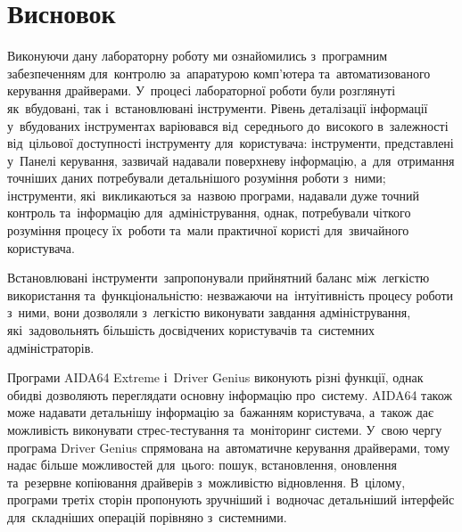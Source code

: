 \documentclass[
	a4paper,
	oneside,
	DIV = 12,
	BCOR = 10mm,
	12pt,
	headings = normal,
]{scrartcl}
\newcommand{\allcaps}[1]{{\addfontfeatures{LetterSpace = 5}#1}}
\begin{document}
	\section{Висновок}
		Виконуючи дану лабораторну роботу ми ознайомились з~програмним забезпеченням для~контролю за~апаратурою комп'ютера та~автоматизованого керування драйверами. У~процесі лабораторної роботи були розглянуті як~вбудовані, так і~встановлювані інструменти. Рівень деталізації інформації у~вбудованих інструментах варіювався від~середнього до~високого в~залежності від~цільової доступності інструменту для~користувача: інструменти, представлені у~Панелі керування, зазвичай надавали поверхневу інформацію, а~для~отримання точніших даних потребували детальнішого розуміння роботи з~ними; інструменти, які~викликаються за~назвою програми, надавали дуже точний контроль та~інформацію для~адміністрування, однак, потребували чіткого розуміння процесу їх~роботи та~мали практичної користі для~звичайного користувача.
		
		Встановлювані інструменти~запропонували прийнятний баланс між~легкістю використання та~функціональністю: незважаючи на~інтуітивність процесу роботи з~ними, вони дозволяли з~легкістю виконувати завдання адміністрування, які~задовольнять більшість досвідчених користувачів та~системних адміністраторів.

		Програми \allcaps{AIDA64} Extreme і~Driver Genius виконують різні функції, однак обидві дозволяють переглядати основну інформацію про~систему. \allcaps{AIDA64} також може надавати детальнішу інформацію за~бажанням користувача, а~також дає можливість виконувати стрес-тестування та~моніторинг системи. У~свою чергу програма Driver Genius спрямована на~автоматичне керування драйверами, тому надає більше можливостей для~цього: пошук, встановлення, оновлення та~резервне копіювання драйверів з~можливістю відновлення. В~цілому, програми третіх сторін пропонують зручніший і~водночас детальніший інтерфейс для~складніших операцій порівняно з~системними.
\end{document}

